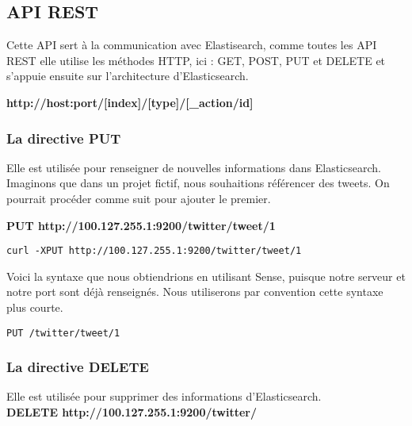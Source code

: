 {\subsection{API REST}
Cette API sert à la communication avec Elastisearch, comme toutes les API REST elle
utilise les méthodes HTTP, ici : GET, POST, PUT et DELETE et s'appuie ensuite sur l'architecture d'Elasticsearch.

\textbf{{\color{grey}http://host:port}/[{\color{red}index}]/[{\color{cyan}type}]/[{\color{yellow}\_action/id}]}


\subsubsection{La directive PUT}
Elle est utilisée pour renseigner de nouvelles informations dans Elasticsearch.
Imaginons que dans un projet fictif, nous souhaitions référencer des tweets.
On pourrait procéder comme suit pour ajouter le premier.

\textbf{PUT  {\color{grey} http://100.127.255.1:9200}/{\color{red}twitter}/{\color{cyan}tweet}/{\color{yellow}1}}

\begin{lstlisting}[style=code,label={lst:RESTexemple1curl},caption={Avec curl}]
curl -XPUT http://100.127.255.1:9200/twitter/tweet/1
\end{lstlisting}

Voici la syntaxe que nous obtiendrions en utilisant Sense, puisque notre serveur 
et notre port sont déjà renseignés. Nous utiliserons par convention cette syntaxe plus courte.
\begin{lstlisting}[style=code,label={lst:RESTexemple1sense},caption={Avec Sense}]
PUT /twitter/tweet/1
\end{lstlisting}



\subsubsection{La directive DELETE}
Elle est utilisée pour supprimer des informations d'Elasticsearch.\\
\textbf{DELETE  {\color{grey} http://100.127.255.1:9200}/{\color{red}twitter}/}\\

}

